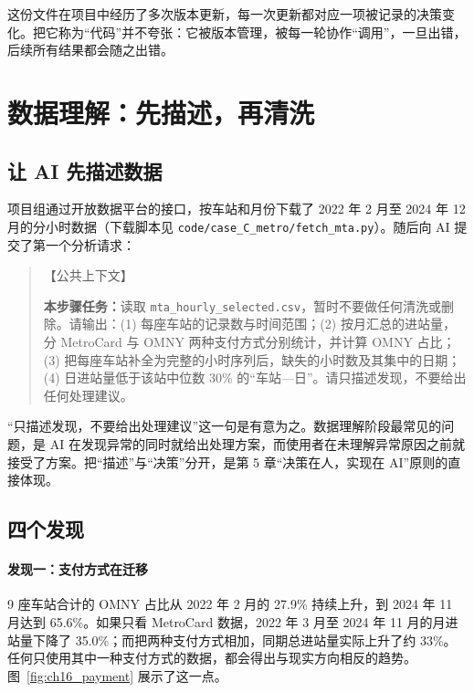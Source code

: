 这份文件在项目中经历了多次版本更新，每一次更新都对应一项被记录的决策变化。把它称为“代码”并不夸张：它被版本管理，被每一轮协作“调用”，一旦出错，后续所有结果都会随之出错。

\section{数据理解：先描述，再清洗}

\subsection{让 AI 先描述数据}

项目组通过开放数据平台的接口，按车站和月份下载了 2022 年 2 月至 2024 年 12 月的分小时数据（下载脚本见 \texttt{code/case\_C\_metro/fetch\_mta.py}）。随后向 AI 提交了第一个分析请求：

\begin{quote}
【公共上下文】

\textbf{本步骤任务：}读取 \texttt{mta\_hourly\_selected.csv}，暂时不要做任何清洗或删除。请输出：(1) 每座车站的记录数与时间范围；(2) 按月汇总的进站量，分 MetroCard 与 OMNY 两种支付方式分别统计，并计算 OMNY 占比；(3) 把每座车站补全为完整的小时序列后，缺失的小时数及其集中的日期；(4) 日进站量低于该站中位数 30\% 的“车站—日”。请只描述发现，不要给出任何处理建议。
\end{quote}

“只描述发现，不要给出处理建议”这一句是有意为之。数据理解阶段最常见的问题，是 AI 在发现异常的同时就给出处理方案，而使用者在未理解异常原因之前就接受了方案。把“描述”与“决策”分开，是第 5 章“决策在人，实现在 AI”原则的直接体现。

\subsection{四个发现}

\paragraph{发现一：支付方式在迁移} 9 座车站合计的 OMNY 占比从 2022 年 2 月的 27.9\% 持续上升，到 2024 年 11 月达到 65.6\%。如果只看 MetroCard 数据，2022 年 3 月至 2024 年 11 月的月进站量下降了 35.0\%；而把两种支付方式相加，同期总进站量实际上升了约 33\%。任何只使用其中一种支付方式的数据，都会得出与现实方向相反的趋势。图~\ref{fig:ch16_payment} 展示了这一点。

